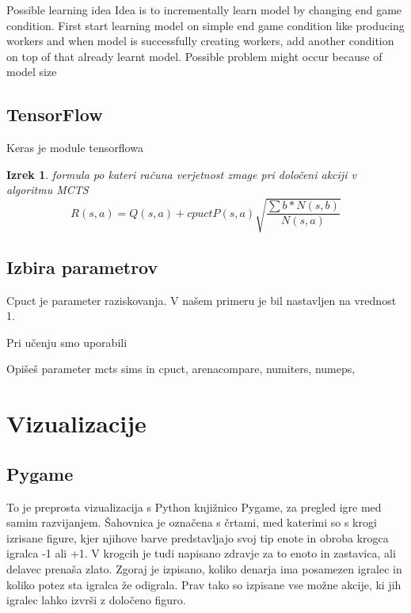 \documentclass[a4paper, 12pt]{book}
\newtheorem{izrek}{Izrek}[chapter]
\begin{document}
Possible learning idea
Idea is to incrementally learn model by changing end game condition. First start learning model on simple end game condition like producing workers and when model is successfully creating workers, add another condition on top of that already learnt model.
Possible problem might occur because of model size



\section{TensorFlow}

Keras je module tensorflowa




\begin{izrek}
	\label{iz:1}
	formula po kateri računa verjetnost zmage pri določeni akciji v algoritmu MCTS
	\begin{equation}
	R(s,a) = Q(s,a) + cpuctP(s, a)\sqrt{\dfrac{\sum{b}*N(s,b)}{N(s,a)}}
	\label{eq:1}
	\end{equation}
\end{izrek}

\section{Izbira parametrov}
Cpuct je parameter raziskovanja. V našem primeru je bil nastavljen na vrednost 1.

Pri učenju smo uporabili 

Opišeš parameter mcts sims in cpuct, arenacompare, numiters, numeps, 






\chapter{Vizualizacije}
\label{chvizualizacija}

\section{Pygame}
To je preprosta vizualizacija s Python knjižnico Pygame, za pregled igre med samim razvijanjem. Šahovnica je označena s črtami, med katerimi so s krogi izrisane figure, kjer njihove barve predstavljajo svoj tip enote in obroba krogca igralca -1 ali +1.
V krogcih je tudi napisano zdravje za to enoto in zastavica, ali delavec prenaša zlato.
Zgoraj je izpisano, koliko denarja ima posamezen igralec in koliko potez sta igralca že odigrala. Prav tako so izpisane vse možne akcije, ki jih igralec lahko izvrši z določeno figuro.
\end{document}

